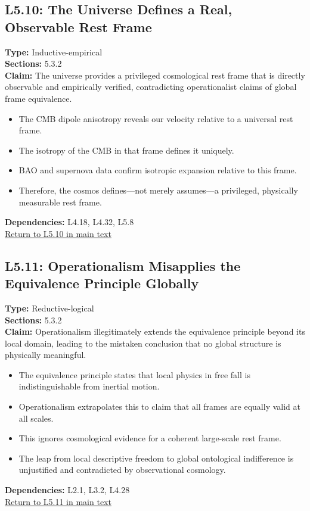 \documentclass[12pt]{book}
\newcommand{\returnlink}[1]{\hyperref[logic:#1]{Return to #1 in main text}\xspace}
\begin{document}
\subsection*{L5.10: The Universe Defines a Real, Observable Rest Frame}
\label{appendix:L5.10}
\textbf{Type:} Inductive-empirical \\
\textbf{Sections:} 5.3.2 \\
\textbf{Claim:} The universe provides a privileged cosmological rest frame that is directly observable and empirically verified, contradicting operationalist claims of global frame equivalence.
\begin{itemize}
  \item The CMB dipole anisotropy reveals our velocity relative to a universal rest frame.
  \item The isotropy of the CMB in that frame defines it uniquely.
  \item BAO and supernova data confirm isotropic expansion relative to this frame.
  \item Therefore, the cosmos defines---not merely assumes---a privileged, physically measurable rest frame.
\end{itemize}
\textbf{Dependencies:} L4.18, L4.32, L5.8 \\
\returnlink{L5.10}

\subsection*{L5.11: Operationalism Misapplies the Equivalence Principle Globally}
\label{appendix:L5.11}
\textbf{Type:} Reductive-logical \\
\textbf{Sections:} 5.3.2 \\
\textbf{Claim:} Operationalism illegitimately extends the equivalence principle beyond its local domain, leading to the mistaken conclusion that no global structure is physically meaningful.
\begin{itemize}
  \item The equivalence principle states that local physics in free fall is indistinguishable from inertial motion.
  \item Operationalism extrapolates this to claim that all frames are equally valid at all scales.
  \item This ignores cosmological evidence for a coherent large-scale rest frame.
  \item The leap from local descriptive freedom to global ontological indifference is unjustified and contradicted by observational cosmology.
\end{itemize}
\textbf{Dependencies:} L2.1, L3.2, L4.28 \\
\returnlink{L5.11}
\end{document}
